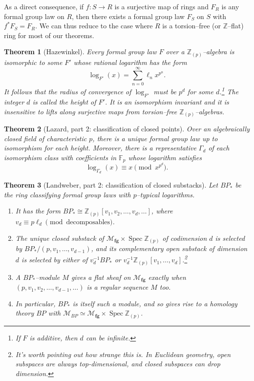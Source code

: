 \documentclass{amsart}
\newcommand{\Z}{\mathbb Z}
\newcommand{\F}{\mathbb F}
\newcommand{\M}{\mathcal{M}}
\newcommand{\<}{\langle}
\renewcommand{\>}{\rangle}
\newcommand{\moduli}[1]{\mathcal{M}_{\mathbf{#1}}}
\DeclareMathOperator{\Spec}{Spec}
\theoremstyle{plain}
\newtheorem*{theorem}{Theorem}
\theoremstyle{definition}
\theoremstyle{remark}
\begin{document}
\noindent As a direct consequence, if $f: S \to R$ is a surjective map of rings and $F_R$ is any formal group law on $R$, then there exists a formal group law $F_S$ on $S$ with $f^* F_S = F_R$.  We can thus reduce to the case where $R$ is a torsion--free (or $\Z$--flat) ring for most of our theorems.

\begin{theorem}[Hazewinkel]
Every formal group law $F$ over a $\Z_{(p)}$--algebra is isomorphic to some $F'$ whose rational logarithm has the form \[\log_{F'}(x) = \sum_{n=0}^\infty \ell_n x^{p^n}.\]  It follows that the radius of convergence of $\log_{F'}$ must be $p^d$ for some $d$.\footnote{If $F$ is additive, then $d$ can be infinite.}  The integer $d$ is called the \emph{height} of $F'$.  It is an isomorphism invariant and it is insensitive to lifts along surjective maps from torsion--free $\Z_{(p)}$--algebras.
\end{theorem}

\begin{theorem}[Lazard, part 2: classification of closed points]
Over an algebraically closed field of characteristic $p$, there is a unique formal group law up to isomorphism for each height.  Moreover, there is a representative $\Gamma_d$ of each isomorphism class with coefficients in $\F_p$ whose logarithm satisfies \[\log_{\Gamma_d}(x) \equiv x \pmod{x^{p^d}}.\]
\end{theorem}

\begin{theorem}[Landweber, part 2: classification of closed substacks]
Let $BP_*$ be the ring classifying formal group laws with $p$--typical logarithms.
\begin{enumerate}
\item It has the form $BP_* \cong \Z_{(p)}[v_1, v_2, \ldots, v_d, \ldots]$, where $v_d \equiv p \ell_d \pmod{\text{decomposables}}$.
\item The unique closed substack of $\moduli{fg} \times \Spec \Z_{(p)}$ of codimension $d$ is selected by $BP_* / (p, v_1, \ldots, v_{d-1})$, and its complementary open substack of dimension $d$ is selected by either of $v_d^{-1} BP_*$ or $v_d^{-1} \Z_{(p)}[v_1, \ldots, v_d]$.\footnote{It's worth pointing out how strange this is. In Euclidean geometry, open subspaces are always top-dimensional, and closed subspaces can drop dimension.}
\item A $BP_*$--module $M$ gives a flat sheaf on $\moduli{fg}$ exactly when $(p, v_1, v_2, \ldots, v_{d-1}, \ldots)$ is a regular sequence $M$ too.
\item In particular, $BP_*$ is itself such a module, and so gives rise to a homology theory $BP$ with $\M_{BP} \simeq \moduli{fg} \times \Spec \Z_{(p)}$.
\end{enumerate}
\end{theorem}
\end{document}
